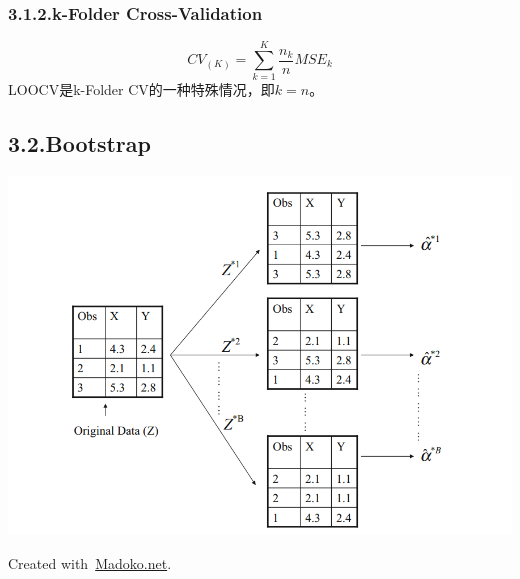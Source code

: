 \documentclass{article}
\begin{document}
{%
\subsubsection{3.1.2.\hspace*{0.5em}k-Folder Cross-Validation}\label{sec-k-folder-cross-validation}%
\label{}%
\noindent{}
\noindent\[%
CV_{(K)}=\sum_{k=1}^{K}\frac{n_k}{n}MSE_k
\]%
\noindent{}LOOCV是k-Folder CV的一种特殊情况，即$k=n$。

\subsection{3.2.\hspace*{0.5em}Bootstrap}\label{sec-bootstrap}%

\noindent{}\includegraphics[keepaspectratio=true,width=\dimmin{}{\dimwidth{0.70}}]{images/Bootstrap}{}%

\begin{mdbmargintb}{4em}{}%
\begin{mdflushright}%
{\tiny{}Created with~\href{https://www.madoko.net}{Madoko.net}.}%
\end{mdflushright}%
\end{mdbmargintb}%
}%
\end{document}
